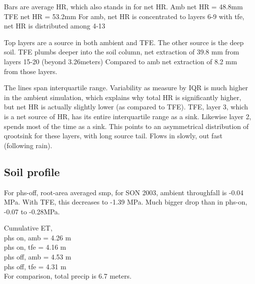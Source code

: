 \documentclass[draft,linenumbers]{agujournal}
\begin{document}
Bars are average HR, which also stands in for net HR.
Amb net HR = 48.8mm
TFE net HR = 53.2mm
For amb, net HR is concentrated to layers 6-9
with tfe, net HR is distributed among 4-13

Top layers are a source in both ambient and TFE. The other source is the deep soil.
TFE plumbs deeper into the soil column, net extraction of 39.8 mm from layers 15-20 (beyond 3.26meters)
Compared to amb net extraction of 8.2 mm from those layers.

The lines span interquartile range. 
Variability as measure by IQR is much higher in the ambient simulation, which explains why total HR is significantly higher, 
but net HR is actually slightly lower (as compared to TFE). 
TFE, layer 3, which is a net source of HR, has its entire interquartile range as a sink.
Likewise layer 2, spends most of the time as a sink.
This points to an asymmetrical distribution of qrootsink for these layers, with long source tail. Flows in slowly, out fast (following rain).



\subsection{Soil profile}

For phs-off, root-area averaged smp, for SON 2003, ambient throughfall is -0.04 MPa.
With TFE, this decreases to -1.39 MPa. Much bigger drop than in phs-on, -0.07 to -0.28MPa.

Cumulative ET, \\
phs on, amb = 4.26 m \\
phs on, tfe = 4.16 m \\
phs off, amb = 4.53 m \\
phs off, tfe = 4.31 m \\

For comparison, total precip is 6.7 meters.



    
\clearpage    
\end{document}
